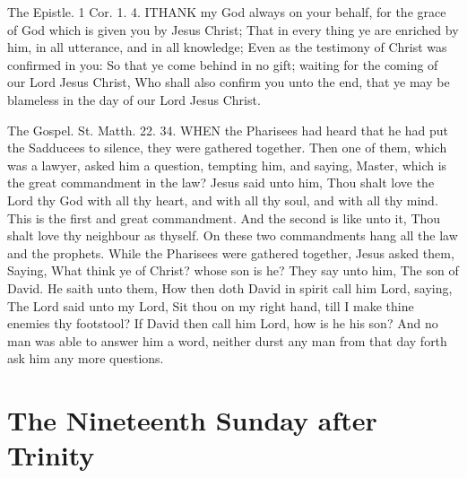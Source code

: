 The Epistle. 1 Cor. 1. 4.
ITHANK my God always on your behalf, for the grace of God which is given you by Jesus Christ; That in every thing ye are enriched by him, in all utterance, and in all knowledge; Even as the testimony of Christ was confirmed in you: So that ye come behind in no gift; waiting for the coming of our Lord Jesus Christ, Who shall also confirm you unto the end, that ye may be blameless in the day of our Lord Jesus Christ.


The Gospel. St. Matth. 22. 34.
WHEN the Pharisees had heard that he had put the Sadducees to silence, they were gathered together. Then one of them, which was a lawyer, asked him a question, tempting him, and saying, Master, which is the great commandment in the law? Jesus said unto him, Thou shalt love the Lord thy God with all thy heart, and with all thy soul, and with all thy mind. This is the first and great commandment. And the second is like unto it, Thou shalt love thy neighbour as thyself. On these two commandments hang all the law and the prophets. While the Pharisees were gathered together, Jesus asked them, Saying, What think ye of Christ? whose son is he? They say unto him, The son of David. He saith unto them, How then doth David in spirit call him Lord, saying, The Lord said unto my Lord, Sit thou on my right hand, till I make thine enemies thy footstool? If David then call him Lord, how is he his son? And no man was able to answer him a word, neither durst any man from that day forth ask him any more questions.

\section{The Nineteenth Sunday after Trinity}
\subsection{}


